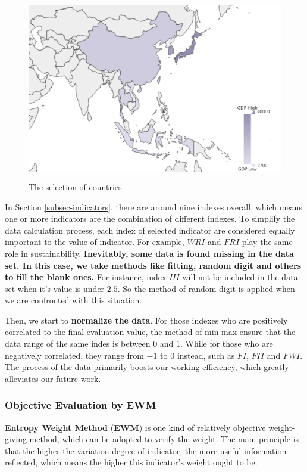 \documentclass{mcmthesis}
\begin{document}
 \begin{figure}[H]
	\centering
	\includegraphics[height=8cm]{Map.png} 
	\caption{The selection of countries.}
	\label{fig:world}
\end{figure}

In Section \ref{subsec-indicators}, there are around nine indexes overall, which means one or more indicators are the combination of different indexes. To simplify the data calculation process, each index of selected indicator are considered equally important to the value of indicator. For example, $WRI$ and $FRI$ play the same role in sustainability. \textbf{Inevitably, some data is found missing in the data set. In this case, we take methods like fitting, random digit and others to fill the blank ones.} For instance, index $HI$ will not be included in the data set when it's value is under $2.5$. So the method of random digit is applied when we are confronted with this situation.

Then, we start to \textbf{normalize the data}. For those indexes who are positively correlated to the final evaluation value, the method of min-max ensure that the data range of the same indes is between $0$ and $1$. While for those who are negatively correlated, they range from $-1$ to $0$ instead, such as $FI$, $FII$ and $FWI$. The process of the data primarily boosts our working efficiency, which greatly alleviates our future work. 

\subsubsection{Objective Evaluation by EWM}
\label{Sec-EMW}
\textbf{Entropy Weight Method} (\textbf{EWM}) is one kind of relatively objective weight-giving method, which can be adopted to verify the weight. The main principle is that the higher the variation degree of indicator, the more useful information reflected, which means the higher this indicator's weight ought to be.
\end{document}
